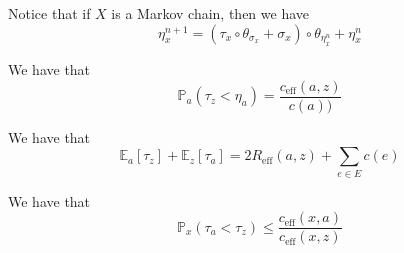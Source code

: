 \begin{lem}
    Notice that if $X$ is a Markov chain, then we have 
    \[\eta_x^{n+1} = (\tau_x \circ \theta_{\sigma_x} + \sigma_x) \circ \theta_{\eta_{x}^n} + \eta_{x}^n \]
\end{lem}


\begin{thm}[]
    We have that
    \[\mathbb{P}_a \left(\tau_z < \eta_a\right) = \frac{c_{\mathrm{eff}}(a,z)}{c(a))}\]
\end{thm}

\begin{thm}
    We have that 
    \[\mathbb{E}_a \left[\tau_z\right] + \mathbb{E}_z \left[\tau_a\right] = 2 R_{\mathrm{eff}}(a,z) + \sum_{e\in E}c(e)\]
\end{thm}


\begin{exer}
    We have that 
  \[\mathbb{P}_x(\tau_a< \tau_z) \leq \frac{c_{\mathrm{eff}}(x,a)}{c_{\mathrm{eff}}(x,z)}\]
\end{exer}




